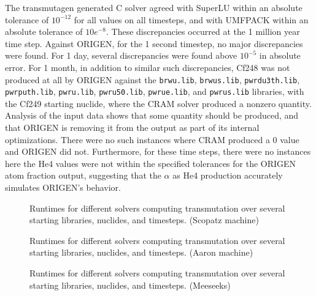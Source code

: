 The transmutagen generated C solver agreed with SuperLU within an absolute
tolerance of $10^{-12}$ for all values on all timesteps, and with UMFPACK
within an absolute tolerance of $10e^{-8}$. These discrepancies occurred at
the 1 million year time step. Against ORIGEN, for the 1 second timestep, no
major discrepancies were found. For 1 day, several discrepancies were found
above $10^{-5}$ in absolute error. For 1 month, in addition to similar such
discrepancies, Cf248 was not produced at all by ORIGEN against the
\texttt{brwu.\allowbreak{}lib}, \texttt{brwus.\allowbreak{}lib},
\texttt{pwrdu3th.\allowbreak{}lib}, \texttt{pwrputh.\allowbreak{}lib},
\texttt{pwru.\allowbreak{}lib}, \texttt{pwru50.\allowbreak{}lib},
\texttt{pwrue.\allowbreak{}lib}, and \texttt{pwrus.\allowbreak{}lib}
libraries, with the Cf249 starting nuclide, where the CRAM solver produced a
nonzero quantity. Analysis of the input data shows that some quantity should
be produced, and that ORIGEN is removing it from the output as part of its
internal optimizations. There were no such instances where CRAM produced a 0
value and ORIGEN did not. Furthermore, for these time steps, there were no
instances here the He4 values were not within the specified tolerances for the
ORIGEN atom fraction output, suggesting that the $\alpha$ as He4 production
accurately simulates ORIGEN's behavior.



\begin{figure}[!ht]
\centering
\resizebox{0.9\textwidth}{!}{}
\caption{Runtimes for different solvers computing transmutation over several starting libraries, nuclides, and timesteps.
(Scopatz machine)}
\label{fig:origen-scopatz}
\end{figure}

\begin{figure}[!ht]
\centering
\resizebox{0.9\textwidth}{!}{}
\caption{Runtimes for different solvers computing transmutation over several starting libraries, nuclides, and timesteps.
 (Aaron machine)}
\label{fig:origen-aaron}
\end{figure}

\begin{figure}[!ht]
\centering
\resizebox{0.9\textwidth}{!}{}
\caption{Runtimes for different solvers computing transmutation over several starting libraries, nuclides, and timesteps.
 (Meeseeks)}
\label{fig:origen-meeseeks}
\end{figure}

